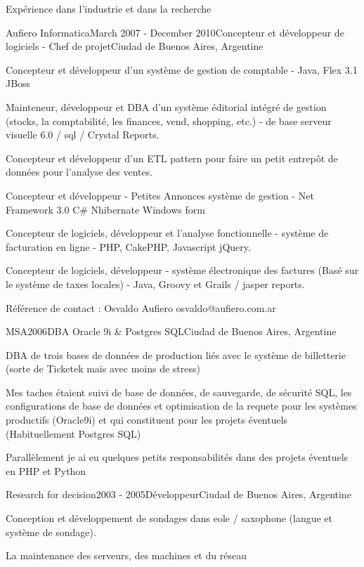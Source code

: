 \documentclass{resume} %
\begin{document}
\begin{rSection}{Exp\'{e}rience dans l'industrie et dans la recherche}
\begin{rSubsection}{Aufiero Informatica}{March 2007 - December 2010}{Concepteur et d\'{e}veloppeur de logiciels - Chef de projet}{Ciudad de Buenos Aires, Argentine}
	\item Concepteur et d\'{e}veloppeur d'un syst\`{e}me de gestion de comptable - Java, Flex 3.1 JBoss
	\item Mainteneur, d\'{e}veloppeur et DBA d'un syst\`{e}me \'{e}ditorial int\'{e}gr\'{e} de gestion (stocks, la comptabilit\'{e}, les finances, vend, shopping, etc.) - de base serveur visuelle 6.0 / sql / Crystal Reports.
	\item Concepteur et d\'{e}veloppeur d'un ETL pattern pour faire un petit entrepôt de donn\'{e}es pour l'analyse des ventes.
	\item Concepteur et d\'{e}veloppeur - Petites Annonces syst\`{e}me de gestion - Net Framework 3.0 C\# Nhibernate Windows form
	\item Concepteur de logiciels, d\'{e}veloppeur et l'analyse fonctionnelle - syst\`{e}me de facturation en ligne - PHP, CakePHP, Javascript jQuery.
	\item Concepteur de logiciels, d\'{e}veloppeur - syst\`{e}me \'{e}lectronique des factures (Bas\'{e} sur le syst\`{e}me de taxes locales) - Java, Groovy et Grails / jasper reports.
	\item R\'{e}f\'{e}rence de contact : Osvaldo Aufiero osvaldo@aufiero.com.ar
\end{rSubsection}


\begin{rSubsection}{MSA}{2006}{DBA Oracle 9i \& Postgres SQL}{Ciudad de Buenos Aires, Argentine}
	\item DBA de trois bases de donn\'{e}es de production li\'{e}s avec le syst\`{e}me de billetterie (sorte de Ticketek mais avec moins de stress)
	\item Mes taches \'{e}taient suivi de base de donn\'{e}es, de sauvegarde, de s\'{e}curit\'{e} SQL, les configurations de base de donn\'{e}es et optimisation de la requete pour les syst\`{e}mes productifs (Oracle9i) et qui constituent pour les projets \'{e}ventuels (Habituellement Postgres SQL)
	\item Parall\`{e}lement je ai eu quelques petits responsabilit\'{e}s dans des projets \'{e}ventuels en PHP et Python 
\end{rSubsection}


\begin{rSubsection}{Research for decision}{2003 - 2005}{D\'{e}veloppeur}{Ciudad de Buenos Aires, Argentine}
	\item Conception et d\'{e}veloppement de sondages dans eole / saxophone (langue et syst\`{e}me de sondage).
	\item La maintenance des serveurs, des machines et du r\'{e}seau
\end{rSubsection}


\end{rSection}
\end{document}

